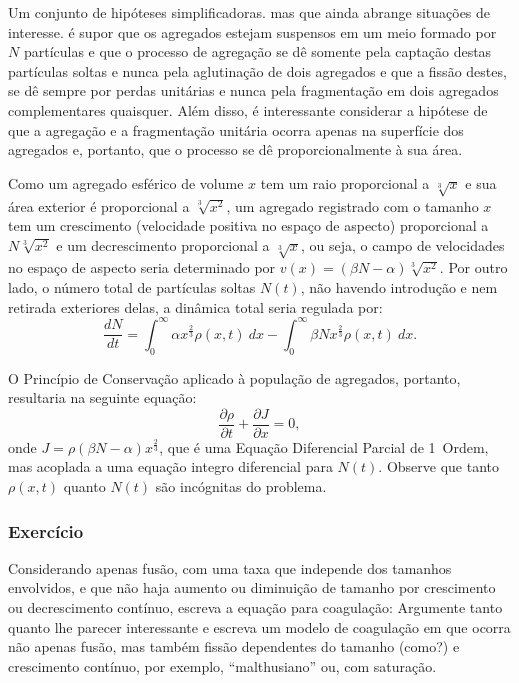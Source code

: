 Um conjunto de hipóteses simplificadoras. mas que ainda abrange situações de interesse. é supor que os agregados estejam suspensos em um meio formado por \(N\) partículas e que o processo de agregação se dê somente pela captação destas partículas soltas e nunca pela aglutinação de dois agregados e que a fissão destes, se dê sempre por perdas unitárias e nunca pela fragmentação em dois agregados complementares quaisquer. Além disso, é interessante considerar a hipótese de que a agregação e a fragmentação unitária ocorra apenas na superfície dos agregados e, portanto, que o processo se dê proporcionalmente à sua área.

Como um agregado esférico de volume \(x\) tem um raio proporcional a \(\sqrt[3]{x}\) e sua área exterior é proporcional a \(\sqrt[3]{x^2}\), um agregado registrado com o tamanho \(x\) tem um crescimento (velocidade positiva no espaço de aspecto) proporcional a \(N\sqrt[3]{x^2}\) e um decrescimento proporcional a \(\sqrt[3]{x}\), ou seja, o campo de velocidades no espaço de aspecto seria determinado por \(v(x) = (\beta N - \alpha) \sqrt[3]{x^2}\). Por outro lado, o número total de partículas soltas \(N(t)\), não havendo introdução e nem retirada exteriores delas, a dinâmica total seria regulada por:
\[\dfrac{dN}{dt}
= \displaystyle\int_{0}^{\infty} \alpha x^{\frac{2}{3}} \rho(x,t)\ dx
- \displaystyle\int_{0}^{\infty} \beta N x^{\frac{2}{3}} \rho(x,t)\ dx.\]

O Princípio de Conservação aplicado à população de agregados, portanto, resultaria na seguinte equação:
\[\dfrac{\partial \rho}{\partial t} + \dfrac{\partial J}{\partial x} = 0,\]
onde \(J = \rho (\beta N - \alpha) x^{\frac{2}{3}}\), que é uma Equação Diferencial Parcial de 1\textordfeminine\ Ordem, mas acoplada a uma equação integro diferencial para \(N(t)\). Observe que tanto \(\rho(x,t)\) quanto \(N(t)\) são incógnitas do problema.

{\small\color{blue}
\subsubsection*{Exercício}

\begin{exercise}
Considerando apenas fusão, com uma taxa que independe dos tamanhos envolvidos, e que não haja aumento ou diminuição de tamanho por crescimento ou decrescimento contínuo, escreva a equação para coagulação: Argumente tanto quanto lhe parecer interessante e escreva um modelo de coagulação em que ocorra não apenas fusão, mas também fissão dependentes do tamanho (como?) e crescimento contínuo, por exemplo, ``malthusiano'' ou, com saturação.
\end{exercise}
}

